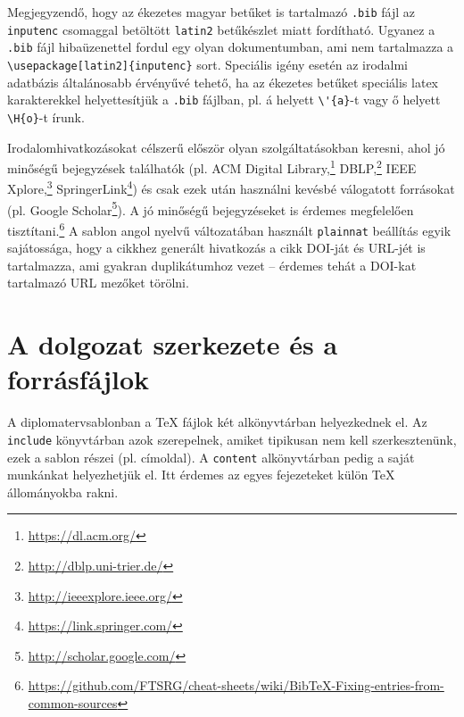 Megjegyzendő, hogy az ékezetes magyar betűket is tartalmazó \verb+.bib+ fájl az \verb+inputenc+ csomaggal betöltött \verb+latin2+ betűkészlet miatt fordítható. Ugyanez a \verb+.bib+ fájl hibaüzenettel fordul egy olyan dokumentumban, ami nem tartalmazza a \verb+\usepackage[latin2]{inputenc}+ sort. Speciális igény esetén az irodalmi adatbázis általánosabb érvényűvé tehető, ha az ékezetes betűket speciális latex karakterekkel helyettesítjük a \verb+.bib+ fájlban, pl. á helyett \verb+\'{a}+-t vagy ő helyett \verb+\H{o}+-t írunk.

Irodalomhivatkozásokat célszerű először olyan szolgáltatásokban keresni, ahol jó minőségű bejegyzések találhatók (pl. ACM Digital Library,\footnote{\url{https://dl.acm.org/}} DBLP,\footnote{\url{http://dblp.uni-trier.de/}} IEEE Xplore,\footnote{\url{http://ieeexplore.ieee.org/}} SpringerLink\footnote{\url{https://link.springer.com/}}) és csak ezek után használni kevésbé válogatott forrásokat (pl. Google Scholar\footnote{\url{http://scholar.google.com/}}). A jó minőségű bejegyzéseket is érdemes megfelelően tisztítani.\footnote{\url{https://github.com/FTSRG/cheat-sheets/wiki/BibTeX-Fixing-entries-from-common-sources}} A sablon angol nyelvű változatában használt \texttt{plainnat} beállítás egyik sajátossága, hogy a cikkhez generált hivatkozás a cikk DOI-ját és URL-jét is tartalmazza, ami gyakran duplikátumhoz vezet -- érdemes tehát a DOI-kat tartalmazó URL mezőket törölni. 

\section{A dolgozat szerkezete és a forrásfájlok}
A diplomatervsablonban a TeX fájlok két alkönyvtárban helyezkednek el. Az \verb+include+ könyvtárban azok szerepelnek, amiket tipikusan nem kell szerkesztenünk, ezek a sablon részei (pl. címoldal). A \verb+content+ alkönyvtárban pedig a saját munkánkat helyezhetjük el. Itt érdemes az egyes fejezeteket külön \TeX{} állományokba rakni.

